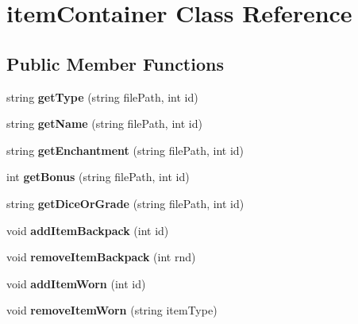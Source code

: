 \hypertarget{classitem_container}{}\section{item\+Container Class Reference}
\label{classitem_container}
\subsection*{Public Member Functions}
\begin{DoxyCompactItemize}
\item 
\hypertarget{classitem_container_a77987d5345c5e5d466a88a1df5f7d308}{}\label{classitem_container_a77987d5345c5e5d466a88a1df5f7d308} 
string {\bfseries get\+Type} (string file\+Path, int id)
\item 
\hypertarget{classitem_container_aa50daab99aacd53128603d38436f3546}{}\label{classitem_container_aa50daab99aacd53128603d38436f3546} 
string {\bfseries get\+Name} (string file\+Path, int id)
\item 
\hypertarget{classitem_container_a6292861f5177b32388322637a301aebd}{}\label{classitem_container_a6292861f5177b32388322637a301aebd} 
string {\bfseries get\+Enchantment} (string file\+Path, int id)
\item 
\hypertarget{classitem_container_a5542838aef955002f47bea0d8efdfb1c}{}\label{classitem_container_a5542838aef955002f47bea0d8efdfb1c} 
int {\bfseries get\+Bonus} (string file\+Path, int id)
\item 
\hypertarget{classitem_container_ad39d4af0d85626c18fd2db308aacb320}{}\label{classitem_container_ad39d4af0d85626c18fd2db308aacb320} 
string {\bfseries get\+Dice\+Or\+Grade} (string file\+Path, int id)
\item 
\hypertarget{classitem_container_a00613322b41793ea9805177c84aeb9fd}{}\label{classitem_container_a00613322b41793ea9805177c84aeb9fd} 
void {\bfseries add\+Item\+Backpack} (int id)
\item 
\hypertarget{classitem_container_a888fa7911cad5d08681f8528d4069c9b}{}\label{classitem_container_a888fa7911cad5d08681f8528d4069c9b} 
void {\bfseries remove\+Item\+Backpack} (int rnd)
\item 
\hypertarget{classitem_container_a5a9803d2e37c3454beec935d03a0672b}{}\label{classitem_container_a5a9803d2e37c3454beec935d03a0672b} 
void {\bfseries add\+Item\+Worn} (int id)
\item 
\hypertarget{classitem_container_af444b69ae3baeb89325574d764855d92}{}\label{classitem_container_af444b69ae3baeb89325574d764855d92} 
void {\bfseries remove\+Item\+Worn} (string item\+Type)
\end{DoxyCompactItemize}
